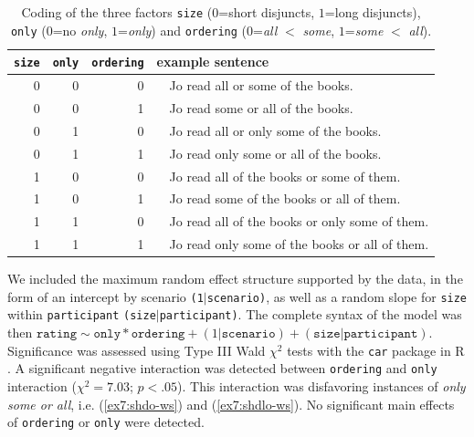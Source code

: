 \begin{table}[H]
	\centering
	\begin{tabular}{|r|r|r|ll|}
		\hline
		\texttt{size} & \texttt{only} & \texttt{ordering} & \multicolumn{2}{l|}{example sentence} \\ \hline
		0    & 0        & 0    & \multicolumn{1}{l}{} (\ref{ex7:shd-sw})  & Jo read all or some of the books.   \\ \hline
		0    & 0        & 1    & \multicolumn{1}{l}{}  (\ref{ex7:shd-ws}) & Jo read some or all of the books.  \\ \hline
		0    & 1        & 0    & \multicolumn{1}{l}{} (\ref{ex7:shdo-sw})  & Jo read all or only some of the books.  \\ \hline
		0    & 1        & 1    & \multicolumn{1}{l}{} (\ref{ex7:shdo-ws})  &  Jo read only some or all of the books.  \\ \hline
		1    & 0        & 0    & \multicolumn{1}{l}{} (\ref{ex7:shdl-sw})  &   Jo read all of the books or some of them. \\ \hline
		1    & 0        & 1    & \multicolumn{1}{l}{} (\ref{ex7:shdl-ws})  &  Jo read some of the books or all of them. \\ \hline
		1    & 1        & 0    & \multicolumn{1}{l}{} (\ref{ex7:shdlo-sw})  &  Jo read all of the books or only some of them.  \\ \hline
		1    & 1        & 1    & \multicolumn{1}{l}{} (\ref{ex7:shdlo-ws})  &  Jo read only some of the books or all of them.  \\ \hline
	\end{tabular}
	\caption{Coding of the three factors \texttt{size} ($0$=short disjuncts, $1$=long disjuncts), \texttt{only} ($0$=no \textit{only}, $1$=\textit{only}) and \texttt{ordering} ($0$=\textit{all} $<$ \textit{some}, $1$=\textit{some} $<$ \textit{all}).}\label{tab7:factor-coding}
\end{table}

 We included the maximum random effect structure supported by the data, in the form of an intercept by scenario \texttt{(1$|$scenario)}, as well as a random slope for \texttt{size} within \texttt{participant} \texttt{(size$|$participant)}. The complete syntax of the model was then $\texttt{rating} \sim \texttt{only}*\texttt{ordering} + (1|\texttt{scenario}) + (\texttt{size}|\texttt{participant})$.\\

Significance was assessed using Type III Wald $\chi^2$ tests with the \texttt{car} package in R \parencite{Fox2019}. A significant negative interaction was detected between \texttt{ordering} and \texttt{only} interaction ($\chi^2 = 7.03$; $p<.05$). This interaction was disfavoring instances of \textit{only some or all}, i.e. (\ref{ex7:shdo-ws}) and (\ref{ex7:shdlo-ws}). No significant main effects of \texttt{ordering} or \texttt{only} were detected.\\

